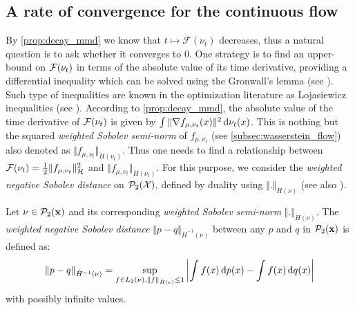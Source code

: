 \subsection{A rate of convergence for the continuous flow}\label{sec:Lojasiewicz_inequality}
By \cref{prop:decay_mmd} we know that $t\mapsto\mathcal{F}(\nu_t)$ decreases, thus a natural question is to ask whether it converges to $0$. One strategy is to find an upper-bound on ${{\mathcal F}}(\nu_t)$ in terms of the absolute value of its time derivative, providing a differential inequality which can be solved using the Gronwall's lemma (see \cite{oguntuase2001inequality}). Such type of inequalities are known in the optimization literature as Lojasiewicz inequalities (see \cite{Bolte:2016}).
According to \cref{prop:decay_mmd}, the absolute value of the time derivative of ${{\mathcal F}}(\nu_t)$ is given by $\int \Vert \nabla f_{\mu,\nu_t}(x) \Vert^2 \mathop{}\!\mathrm{d} \nu_t(x)$. This is nothing but the squared \textit{weighted Sobolev semi-norm} of $f_{\mu,\nu_t}$ (see \cref{subsec:wasserstein_flow}) also denoted as $\Vert f_{\mu,\nu_t} \Vert_{\dot{H}(\nu_t)}$. Thus one needs to find a relationship between ${{\mathcal F}}(\nu_t) = \frac{1}{2} \Vert f_{\mu,\nu_t} \Vert_{\mathcal{H}}^2 $ and $\Vert f_{\mu,\nu_t} \Vert_{\dot{H}(\nu_t)}$. For this purpose, we consider the \textit{weighted negative Sobolev distance} on $\mathcal{P}_2({{\mathcal X}})$, defined by duality using $\Vert . \Vert_{\dot{H}(\nu)}$ (see also \cite{Peyre:2011}).
\begin{definition}\label{def:neg_sobolev}
	Let $\nu\in \mathcal{P}_2({\mathbf x})$ and its corresponding \textit{weighted Sobolev semi-norm} $ \Vert . \Vert_{\dot{H}(\nu)} $. %
	The \textit{weighted negative Sobolev distance} $\Vert p - q \Vert_{\dot{H}^{-1}(\nu)}$ between any $p$ and $q$ in $\mathcal{P}_2({\mathbf x})$  is defined as:
\begin{align}\label{eq:neg_sobolev}
	\Vert p - q \Vert_{\dot{H}^{-1}(\nu)} = \sup_{f\in L_2(\nu), \Vert f \Vert_{\dot{H}(\nu)} \leq 1 } \left\vert \int f(x)\mathop{}\!\mathrm{d} p(x) - \int f(x)\mathop{}\!\mathrm{d} q(x) \right\vert 
\end{align}	
with possibly infinite values.
\end{definition}
